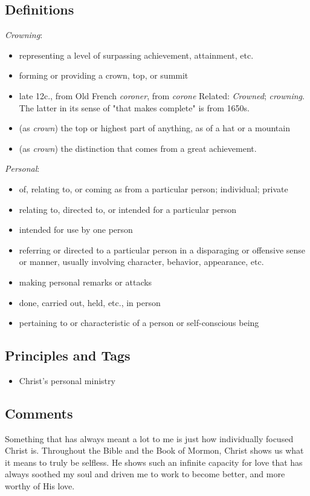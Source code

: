 \documentclass[12pt]{report}
\begin{document}
\subsection{Definitions\label{intro:DFN3}}
\emph{Crowning}: \begin{itemize}
\item representing a level of surpassing achievement, attainment, etc.
\item forming or providing a crown, top, or summit
\item late 12c., from Old French \emph{coroner}, from \emph{corone} Related: \emph{Crowned}; \emph{crowning}. The latter in its sense of "that makes complete" is from 1650s.
\item (as \emph{crown}) the top or highest part of anything, as of a hat or a mountain
\item (as \emph{crown}) the distinction that comes from a great achievement.
\end{itemize}
\emph{Personal}: \begin{itemize}
\item of, relating to, or coming as from a particular person; individual; private
\item relating to, directed to, or intended for a particular person
\item intended for use by one person
\item referring or directed to a particular person in a disparaging or offensive sense or manner, usually involving character, behavior, appearance, etc.
\item making personal remarks or attacks
\item done, carried out, held, etc., in person
\item pertaining to or characteristic of a person or self-conscious being
\end{itemize}

\subsection{Principles and Tags\label{intro:principles3}}
\begin{itemize}
\item {}Christ's personal ministry
\end{itemize}

\subsection{Comments\label{intro:comments3}}
Something that has always meant a lot to me is just how individually focused Christ is.  Throughout the Bible and the Book of Mormon, Christ shows us what it means to truly be selfless.  He shows such an infinite capacity for love that has always soothed my soul and driven me to work to become better, and more worthy of His love.  
\end{document}
